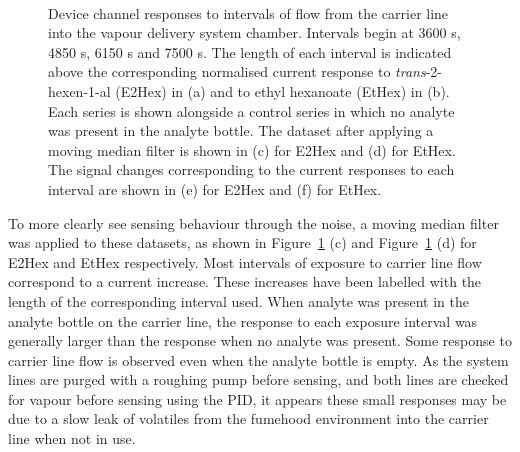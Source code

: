 \documentclass[
  a4paper,
]{scrbook}
\begin{document}
\begin{figure}
\begin{minipage}[t]{0.45\linewidth}
{{}

}

\end{minipage}%
%
\begin{minipage}[t]{0.01\linewidth}

{\centering 

~

}

\end{minipage}%

\caption[Device channel responses to intervals of
\emph{trans}-2-hexen-1-al (E2Hex) or ethyl hexanoate (EtHex) flow from
the carrier line into the vapour delivery system chamber, with and
without filtering, and compared with a control series where no analyte
was present in the analyte bottle.]{\label{fig-EtHex-sampling}Device
channel responses to intervals of flow from the carrier line into the
vapour delivery system chamber. Intervals begin at 3600 s, 4850 s, 6150
s and 7500 s. The length of each interval is indicated above the
corresponding normalised current response to \emph{trans}-2-hexen-1-al
(E2Hex) in (a) and to ethyl hexanoate (EtHex) in (b). Each series is
shown alongside a control series in which no analyte was present in the
analyte bottle. The dataset after applying a moving median filter is
shown in (c) for E2Hex and (d) for EtHex. The signal changes
corresponding to the current responses to each interval are shown in (e)
for E2Hex and (f) for EtHex.}

\end{figure}

To more clearly see sensing behaviour through the noise, a moving median
filter was applied to these datasets, as shown in
Figure~\ref{fig-EtHex-sampling} (c) and Figure~\ref{fig-EtHex-sampling}
(d) for E2Hex and EtHex respectively. Most intervals of exposure to
carrier line flow correspond to a current increase. These increases have
been labelled with the length of the corresponding interval used. When
analyte was present in the analyte bottle on the carrier line, the
response to each exposure interval was generally larger than the
response when no analyte was present. Some response to carrier line flow
is observed even when the analyte bottle is empty. As the system lines
are purged with a roughing pump before sensing, and both lines are
checked for vapour before sensing using the PID, it appears these small
responses may be due to a slow leak of volatiles from the fumehood
environment into the carrier line when not in use.
\end{document}
